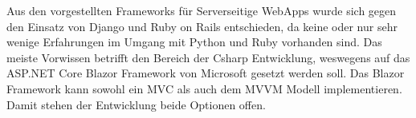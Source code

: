 Aus den vorgestellten Frameworks für Serverseitige WebApps wurde sich gegen den Einsatz von Django und Ruby on Rails entschieden, da keine oder nur sehr wenige Erfahrungen im Umgang mit Python und Ruby vorhanden sind. Das meiste Vorwissen betrifft den Bereich der Csharp Entwicklung, weswegens auf das ASP.NET Core Blazor Framework von Microsoft gesetzt werden soll. Das Blazor Framework kann sowohl ein MVC als auch dem MVVM Modell implementieren. Damit stehen der Entwicklung beide Optionen offen.




